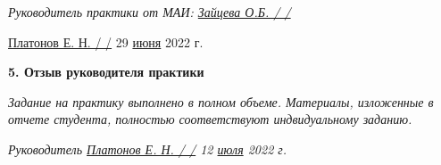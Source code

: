 {\em Руководитель практики от МАИ: \underline{Зайцева О.Б. / \hspace{3cm} /}}

\vspace{20pt}

\underline{Платонов Е. Н. / \hspace{3cm} /} 29 \underline{июня} 2022 г.

\vspace{10pt}
\pagebreak

\textbf{5. Отзыв руководителя практики}

{\em Задание на практику выполнено в полном объеме. Материалы, изложенные в отчете студента, полностью соответствуют индвидуальному заданию. }

\vspace{30pt}

{\em Руководитель \hspace{3cm} \underline{ Платонов Е. Н. / \hspace{3cm} /} 12 \underline{июля} 2022 г.}
\pagebreak
